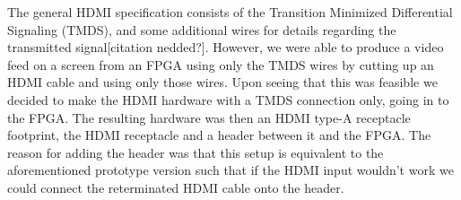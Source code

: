 The general HDMI specification consists of the Transition Minimized Differential Signaling (TMDS),
and some additional wires for details regarding the transmitted signal[citation nedded?].
However, we were able to produce a video feed on a screen from an FPGA using only the TMDS wires by cutting up an HDMI cable and using only those wires.
Upon seeing that this was feasible we decided to make the HDMI hardware with a TMDS connection only,
going in to the FPGA. The resulting hardware was then an HDMI type-A receptacle footprint,
the HDMI receptacle and a header between it and the FPGA.
The reason for adding the header was that this setup is equivalent to the aforementioned prototype
version such that if the HDMI input wouldn't work we could connect the reterminated HDMI cable onto the header.
